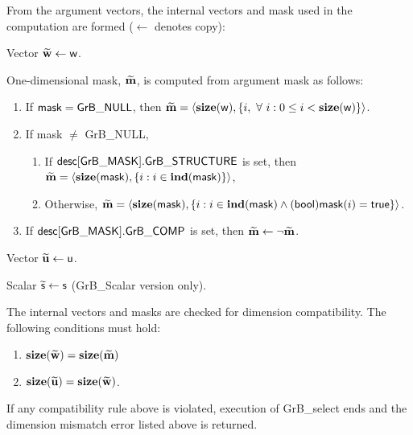 From the argument vectors, the internal vectors and mask used in 
the computation are formed ($\leftarrow$ denotes copy):
\begin{enumerate}
    \item Vector ${\bf \widetilde{w}} \leftarrow {\sf w}$.

    \item One-dimensional mask, ${\bf \widetilde{m}}$, is computed from 
    argument {\sf mask} as follows:
    \begin{enumerate}
        \item If ${\sf mask} = {\sf GrB\_NULL}$, then ${\bf \widetilde{m}} = 
        \langle \bold{size}({\sf w}), \{i, \ \forall \ i : 0 \leq i < 
        \bold{size}({\sf w}) \} \rangle$.

        \item If {\sf mask} $\ne$ {\sf GrB\_NULL},  
        \begin{enumerate}
            \item If ${\sf desc[GrB\_MASK].GrB\_STRUCTURE}$ is set, then
            ${\bf \widetilde{m}} = 
            \langle \bold{size}({\sf mask}), \{i : i \in \bold{ind}({\sf mask}) \} \rangle$,
            \item Otherwise, ${\bf \widetilde{m}} = 
            \langle \bold{size}({\sf mask}), \{i : i \in \bold{ind}({\sf mask}) \wedge
            ({\sf bool}){\sf mask}(i) = {\sf true} \} \rangle$.
        \end{enumerate}

        \item    If ${\sf desc[GrB\_MASK].GrB\_COMP}$ is set, then 
        ${\bf \widetilde{m}} \leftarrow \neg {\bf \widetilde{m}}$.
    \end{enumerate}

    \item Vector ${\bf \widetilde{u}} \leftarrow {\sf u}$.

{\color{red}
    \item Scalar $\widetilde{\sf s} \leftarrow {\sf s}$ ({\sf GrB\_Scalar} version only).
}
\end{enumerate}

The internal vectors and masks are checked for dimension compatibility. 
The following conditions must hold:
\begin{enumerate}
    \item $\bold{size}({\bf \widetilde{w}}) = \bold{size}({\bf \widetilde{m}})$
    \item $\bold{size}({\bf \widetilde{u}}) = \bold{size}({\bf \widetilde{w}})$.
\end{enumerate}
If any compatibility rule above is violated, execution of {\sf GrB\_select} ends and 
the dimension mismatch error listed above is returned.

